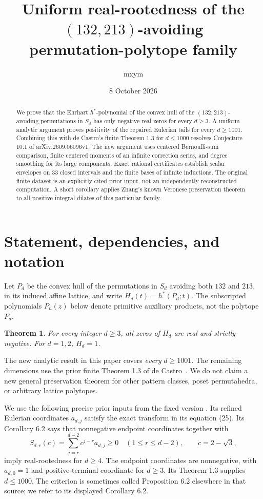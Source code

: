 \documentclass[11pt]{article}
\title{Uniform real-rootedness of the $(132,213)$-avoiding\\permutation-polytope family}
\author{mxym}
\date{8 October 2026}
\newtheorem{theorem}{Theorem}[section]
\theoremstyle{remark}\newtheorem{remark}[theorem]{Remark}
\newcommand{\cc}{2-\sqrt3}
\begin{document}
\maketitle
\begin{abstract}
We prove that the Ehrhart $h^*$-polynomial of the convex hull of the
$(132,213)$-avoiding permutations in $S_d$ has only negative real zeros for
every $d\ge3$. A uniform analytic argument proves positivity of the repaired
Eulerian tails for every $d\ge1001$. Combining this with de Castro's finite
Theorem 1.3 for $d\le1000$ resolves Conjecture 10.1 of
arXiv:2609.06096v1. The new argument uses centered Bernoulli-sum comparison,
finite centered moments of an infinite correction series, and degree smoothing
for its large components. Exact rational certificates establish scalar
envelopes on 33 closed intervals and the finite bases of infinite inductions.
The original finite dataset is an explicitly cited prior input, not an
independently reconstructed computation. A short corollary applies Zhang's
known Veronese preservation theorem to all positive integral dilates of this
particular family.
\end{abstract}
\tableofcontents

\section{Statement, dependencies, and notation}\label{sec:inputs}
Let $P_d$ be the convex hull of the permutations in $S_d$ avoiding both
$132$ and $213$, in its induced affine lattice, and write
$H_d(t)=h^*(P_d;t)$. The subscripted polynomials $P_n(z)$ below denote
primitive auxiliary products, not the polytope $P_d$.
\begin{theorem}\label{thm:main}
For every integer $d\ge3$, all zeros of $H_d$ are real and strictly negative.
For $d=1,2$, $H_d=1$.
\end{theorem}
The new analytic result in this paper covers \emph{every} $d\ge1001$.
The remaining dimensions use the prior finite Theorem 1.3 of
de Castro~\cite{decastro}. We do not claim a new general preservation theorem
for other pattern classes, poset permutahedra, or arbitrary lattice polytopes.

We use the following precise prior inputs from the fixed version
\cite{decastro}. Its refined Eulerian coordinates $a_{d,j}$ satisfy the exact
transform in its equation (25). Its Corollary 6.2 says that nonnegative
endpoint coordinates together with
\begin{equation}\label{eq:tails}
 S_{d,r}(c)=\sum_{j=r}^{d-2}c^{j-r}a_{d,j}\ge0
 \quad(1\le r\le d-2),\qquad c=\cc,
\end{equation}
imply real-rootedness for $d\ge4$. The endpoint coordinates are nonnegative,
with $a_{d,0}=1$ and positive terminal coordinate for $d\ge3$.
Its Theorem 1.3 supplies $d\le1000$.
The criterion is sometimes called Proposition 6.2 elsewhere in that source;
we refer to its displayed Corollary 6.2.
\end{document}
